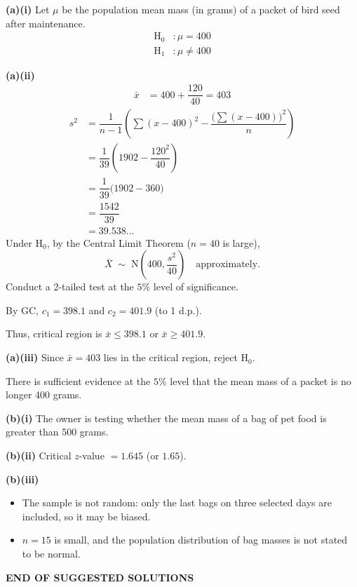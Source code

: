 \documentclass[a4paper,11pt,oneside]{article}
\newcommand{\partlabel}[1]{\par\needspace{3\baselineskip}\smallskip\noindent\textbf{#1}\quad}
\begin{document}
\begin{solbox}
\partlabel{(a)(i)}
Let $\mu$ be the population mean mass (in grams) of a packet of bird seed after maintenance.
\begin{align*}
\mathrm{H}_0&: \mu = 400\\
\mathrm{H}_1&: \mu \neq 400
\end{align*}
\partlabel{(a)(ii)}
\begin{align*}
\bar{x} &= 400 + \dfrac{120}{40} = 403
\end{align*}
\begin{align*}
s^2
&= \dfrac{1}{n-1}\left(\sum(x-400)^2 - \dfrac{\bigl(\sum(x-400)\bigr)^2}{n}\right)\\
&= \dfrac{1}{39}\left(1902 - \dfrac{120^2}{40}\right)\\
&= \dfrac{1}{39}\bigl(1902 - 360\bigr)\\
&= \dfrac{1542}{39}\\
&= 39.538\ldots
\end{align*}
Under $\mathrm{H}_0$, by the Central Limit Theorem ($n=40$ is large),
\[
\bar{X}\;\sim\;\mathrm{N}\!\left(400,\dfrac{s^2}{40}\right)
\quad\text{approximately.}
\]
Conduct a 2-tailed test at the $5\%$ level of significance.
\begin{center}
\end{center}
By GC, $c_1 = 398.1$ and $c_2 = 401.9$ (to 1 d.p.).

Thus, critical region is $\bar{x}\le 398.1$ or $\bar{x}\ge 401.9$.
\partlabel{(a)(iii)}
Since $\bar{x}=403$ lies in the critical region, reject $\mathrm{H}_0$.

There is sufficient evidence at the $5\%$ level that the mean mass of a packet is no longer 400 grams.
\partlabel{(b)(i)}
The owner is testing whether the mean mass of a bag of pet food is greater than 500 grams.
\partlabel{(b)(ii)}
Critical $z$-value $= 1.645$ (or $1.65$).
\partlabel{(b)(iii)}
\begin{itemize}[leftmargin=1.8em,itemsep=0.4ex]
\item The sample is not random: only the last bags on three selected days are included, so it may be biased.
\item $n=15$ is small, and the population distribution of bag masses is not stated to be normal.
\end{itemize}
\end{solbox}
\vspace{3ex}
\begin{center}\textbf{END OF SUGGESTED SOLUTIONS}\end{center}
\end{document}

